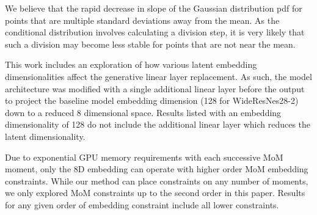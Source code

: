 \documentclass[10pt,twocolumn,letterpaper]{article}
\begin{document}
We believe that the rapid decrease in slope of the Gaussian distribution pdf for points that are multiple standard deviations away from the mean.  
As the conditional distribution involves calculating a division step, it is very likely that such a division may become less stable for points that are not near the mean.  

This work includes an exploration of how various latent embedding dimensionalities affect the generative linear layer replacement.
As such, the model architecture was modified with a single additional linear layer before the output to project the baseline model embedding dimension (128 for WideResNes28-2) down to a reduced 8 dimensional space.
Results listed with an embedding dimensionality of 128 do not include the additional linear layer which reduces the latent dimensionality. 

Due to exponential GPU memory requirements with each successive MoM moment, only the 8D embedding can operate with higher order MoM embedding constraints. 
While our method can place constraints on any number of moments, we only explored MoM constraints up to the second order in this paper. 
Results for any given order of embedding constraint include all lower constraints.

\end{document}
